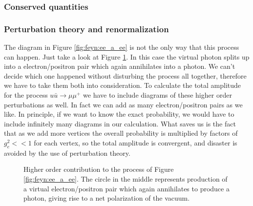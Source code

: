\subsubsection{Conserved quantities}

\subsubsection{Perturbation theory and renormalization}
The diagram in Figure \ref{fig:feyn:ee_a_ee} is not the only way that this process can happen. Just take a look at Figure \ref{fig:feyn:ee_a_ee_2}. In this case the virtual photon splits up into a electron/positron pair which again annihilates into a photon. We can't decide which one happened without disturbing the process all together, therefore we have to take them both into consideration. To calculate the total amplitude for the process $u \bar u \rightarrow \mu \mu^+$ we have to include diagrams of these higher order perturbations as well. In fact we can add as many electron/positron pairs as we like. In principle, if we want to know the exact probability, we would have to include infinitely many diagrams in our calculation. What saves us is the fact that as we add more vertices the overall probability is multiplied by factors of $g_e^2 << 1$ for each vertex, so the total amplitude is convergent, and disaster is avoided by the use of perturbation theory.

\begin{figure}[htp]
\centering
	
\caption{Higher order contribution to the process of Figure \ref{fig:feyn:ee_a_ee}. The circle in the middle represents production of a virtual electron/positron pair which again annihilates to produce a photon, giving rise to a net polarization of the vacuum.} \label{fig:feyn:ee_a_ee_2}
\end{figure}

